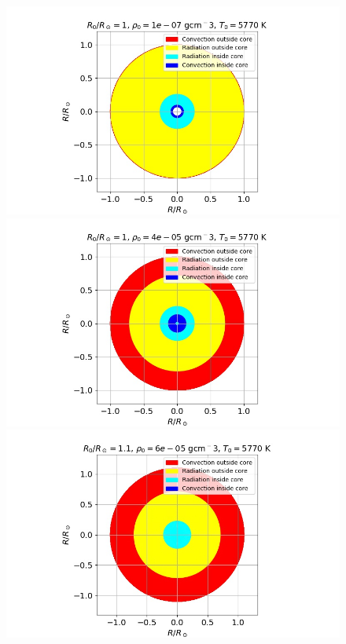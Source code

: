 \documentclass{emulateapj}
\begin{document}
\begin{figure}
		\includegraphics[width=1\columnwidth]{CrossSec4.jpg}
		\includegraphics[width=1\columnwidth]{CrossSec5.jpg}
		\includegraphics[width=1\columnwidth]{CrossSec6.jpg}

\end{figure}
\end{document}
